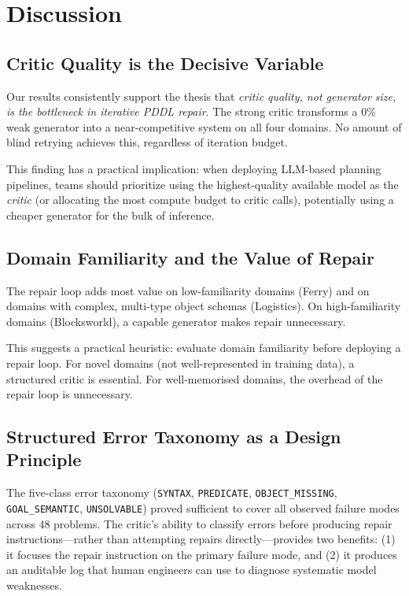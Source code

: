 \documentclass{article}
\begin{document}
\section{Discussion}
\label{sec:discussion}

\subsection{Critic Quality is the Decisive Variable}
\label{sec:key_finding}

Our results consistently support the thesis that \emph{critic quality, not generator
size, is the bottleneck in iterative PDDL repair}.  The strong critic transforms a
0\% weak generator into a near-competitive system on all four domains.  No amount
of blind retrying achieves this, regardless of iteration budget.

This finding has a practical implication: when deploying LLM-based planning pipelines,
teams should prioritize using the highest-quality available model as the \emph{critic}
(or allocating the most compute budget to critic calls), potentially using a cheaper
generator for the bulk of inference.

\subsection{Domain Familiarity and the Value of Repair}
\label{sec:familiarity}

The repair loop adds most value on low-familiarity domains (Ferry) and on domains
with complex, multi-type object schemas (Logistics).  On high-familiarity domains
(Blocksworld), a capable generator makes repair unnecessary.

This suggests a practical heuristic: evaluate domain familiarity before deploying
a repair loop.  For novel domains (not well-represented in training data), a
structured critic is essential.  For well-memorised domains, the overhead of the
repair loop is unnecessary.

\subsection{Structured Error Taxonomy as a Design Principle}
\label{sec:taxonomy}

The five-class error taxonomy (\texttt{SYNTAX}, \texttt{PREDICATE},
\texttt{OBJECT\_MISSING}, \texttt{GOAL\_SEMANTIC}, \texttt{UNSOLVABLE}) proved
sufficient to cover all observed failure modes across 48 problems.  The critic's
ability to classify errors before producing repair instructions---rather than
attempting repairs directly---provides two benefits:
(1) it focuses the repair instruction on the primary failure mode, and
(2) it produces an auditable log that human engineers can use to diagnose systematic
model weaknesses.
\end{document}
